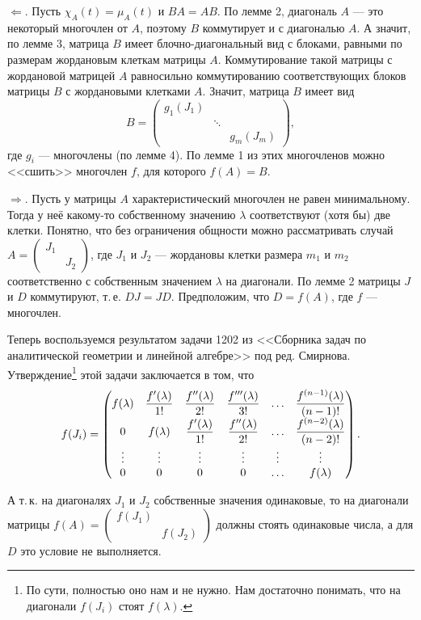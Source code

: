 \begin{solution}
    $\Leftarrow$. Пусть $\chi_A(t) = \mu_A(t)$ и $BA = AB$. По лемме 2, диагональ $A$ --- это некоторый многочлен от $A$, поэтому $B$ коммутирует и с диагональю $A$. А значит, по лемме 3, матрица $B$ имеет блочно-диагональный вид с блоками, равными по размерам жордановым клеткам матрицы $A$. Коммутирование такой матрицы с жордановой матрицей $A$ равносильно коммутированию соответствующих блоков матрицы $B$ с жордановыми клетками $A$. Значит, матрица $B$ имеет вид
    \[
        B =
        \begin{pmatrix}
            g_1(J_1) & & \\
             & \ddots & \\
             & & g_m(J_m)
        \end{pmatrix},
    \]
    где $g_i$ --- многочлены (по лемме 4). По лемме 1 из этих многочленов можно <<сшить>> многочлен $f$, для которого $f(A) = B$.

    $\Rightarrow$. Пусть у матрицы $A$ характеристический многочлен не равен минимальному. Тогда у неё какому-то собственному значению $\lambda$ соответствуют (хотя бы) две клетки. Понятно, что без ограничения общности можно рассматривать случай
    $
    A =
    \begin{pmatrix}
        J_1 & \\
         & J_2
    \end{pmatrix}
    $, где $J_1$ и $J_2$ --- жордановы клетки размера $m_1$ и $m_2$ соответственно с собственным значением $\lambda$ на диагонали. По лемме 2 матрицы $J$ и $D$ коммутируют, т.\,е. $DJ = JD$. Предположим, что $D = f(A)$, где $f$ --- многочлен.

    Теперь воспользуемся результатом задачи 1202 из <<Сборника задач по аналитической геометрии и линейной алгебре>> под ред. Смирнова. Утверждение\footnote{По сути, полностью оно нам и не нужно. Нам достаточно понимать, что на диагонали $f(J_i)$ стоят $f(\lambda)$.} этой задачи заключается в том, что
    \[
        f(J_i) =
        \begin{pmatrix}
            \displaystyle f(\lambda) & \displaystyle\frac{f^\prime(\lambda)}{1!} & \displaystyle\frac{f^{\prime\prime}(\lambda)}{2!} & \displaystyle\frac{f^{\prime\prime\prime}(\lambda)}{3!} & \ldots & \displaystyle\frac{f^{(n - 1)}(\lambda)}{(n - 1)!}\\
            0 & \displaystyle f(\lambda) & \displaystyle\frac{f^\prime(\lambda)}{1!} & \displaystyle\frac{f^{\prime\prime}(\lambda)}{2!} & \ldots & \displaystyle\frac{f^{(n - 2)}(\lambda)}{(n - 2)!}\\
            \vdots & \vdots & \vdots & \vdots & \vdots & \vdots\\
            0 & 0 & 0 & 0 & \ldots & f(\lambda)
        \end{pmatrix}.
    \]

    А т.\,к. на диагоналях $J_1$ и $J_2$ собственные значения одинаковые, то на диагонали матрицы
    $
    f(A) =
    \begin{pmatrix}
        f(J_1) & \\
         & f(J_2)
    \end{pmatrix}
    $ должны стоять одинаковые числа, а для $D$ это условие не выполняется.
\end{solution}

